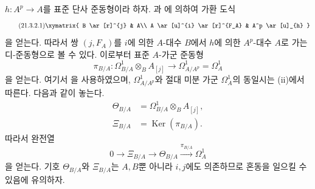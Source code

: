 \begin{env}[21.3.2]
\label{0.21.3.2-ko}
$h:A^p\to A$를 표준 단사 준동형이라 하자.
과 에 의하여 가환 도식
\begin{equation}
\tag{21.3.2.1}\label{0.21.3.2.1-ko}
\xymatrix{
 B \ar[r]^{j} & A\\
 A \ar[u]^{i} \ar[r]^{F_A} & A^p \ar[u]_{h}
}
\end{equation}
을 얻는다. 따라서 쌍 $(j,F_A)$를 $i$에 의한 $A$-대수 $B$에서
$h$에 의한 $A^p$-대수 $A$로 가는 디-준동형으로 볼 수 있다. 이로부터
표준 $A$-가군 준동형
\begin{equation}
\tag{21.3.2.2}\label{0.21.3.2.2-ko}
\pi_{B/A}:\Omega^1_{B/A}\otimes_B A_{[j]}
\longrightarrow\Omega^1_{A/A^p}=\Omega^1_A
\end{equation}
을 얻는다. 여기서 을 사용하였으며,
$\Omega^1_{A/A^p}$와 절대 미분 가군 $\Omega^1_A$의 동일시는
(ii)에서 따른다. 다음과 같이 놓는다.
\begin{align}
\tag{21.3.2.3}\label{0.21.3.2.3-ko}
\Theta_{B/A}&=\Omega^1_{B/A}\otimes_B A_{[j]},\\
\tag{21.3.2.4}\label{0.21.3.2.4-ko}
\Xi_{B/A}&=\operatorname{Ker}(\pi_{B/A}).
\end{align}
따라서 완전열
\begin{equation}
\tag{21.3.2.5}\label{0.21.3.2.5-ko}
0\longrightarrow\Xi_{B/A}\longrightarrow\Theta_{B/A}
\xrightarrow{\pi_{B/A}}\Omega^1_A
\end{equation}
을 얻는다. 기호 $\Theta_{B/A}$와 $\Xi_{B/A}$는 $A,B$뿐 아니라
$i,j$에도 의존하므로 혼동을 일으킬 수 있음에 유의하자.
\end{env}

